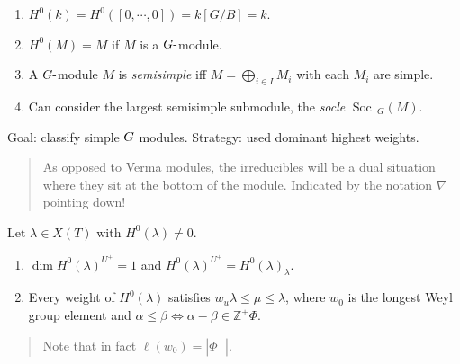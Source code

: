 \begin{remark}

\begin{remark}

\hfill

\begin{enumerate}
\def\labelenumi{\arabic{enumi}.}
\tightlist
\item
  \(H^0(k) = H^0({\left[ {0, \cdots, 0} \right]}) = k[G/B] = k\).
\item
  \(H^0(M) = M\) if \(M\) is a \(G{\hbox{-}}\)module.
\item
  A \(G{\hbox{-}}\)module \(M\) is \emph{semisimple} iff
  \(M = \bigoplus_{i\in I} M_i\) with each \(M_i\) are simple.
\item
  Can consider the largest semisimple submodule, the \emph{socle}
  \(\operatorname{Soc}\,_G(M)\).
\end{enumerate}

\end{remark}

\end{remark}

\begin{center}
\end{center}

Goal: classify simple \(G{\hbox{-}}\)modules. Strategy: used dominant
highest weights.

\begin{quote}
As opposed to Verma modules, the irreducibles will be a dual situation
where they sit at the bottom of the module. Indicated by the notation
\(\nabla\) pointing down!
\end{quote}

\begin{proposition}[?]

\begin{proposition}[?]

Let \(\lambda \in X(T)\) with \(H^0(\lambda) \neq 0\).

\begin{enumerate}
\def\labelenumi{\arabic{enumi}.}
\tightlist
\item
  \(\dim H^0(\lambda)^{U^+} = 1\) and
  \(H^0(\lambda)^{U^+} = H^0(\lambda)_\lambda\).
\item
  Every weight of \(H^0(\lambda)\) satisfies
  \(w_u \lambda \leq \mu \leq \lambda\), where \(w_0\) is the longest
  Weyl group element and
  \(\alpha\leq \beta \iff \alpha-\beta \in {\mathbb{Z}}^{+}\Phi\).
\end{enumerate}

\begin{quote}
Note that in fact \(\ell(w_0) = {\left\lvert {\Phi^+} \right\rvert}\).
\end{quote}

\end{proposition}

\end{proposition}

